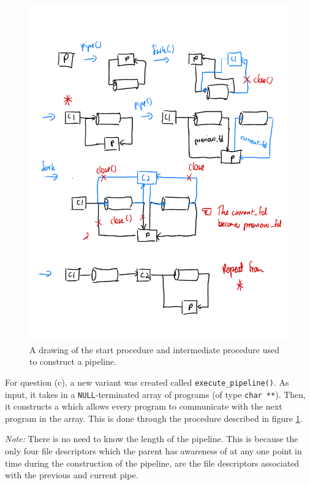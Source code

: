 \documentclass[12pt]{article}
\DeclareRobustCommand{\ul}[1]{%
	\uline{\phantom{#1}}%
	\llap{\contour{white}{#1}}%
}
\begin{document}
\begin{figure}[H]
\centering
\includegraphics{task1qc1}
\caption{A drawing of the start procedure and intermediate
procedure used to construct a pipeline.}
\label{gen_pipeline}
\end{figure}

\newpage

For question (c), a new variant was created called
\texttt{execute\_pipeline()}. As input, it takes in a
\texttt{NULL}-terminated array of programs (of type \texttt{char
**}). Then, it constructs a \ul{pipeline} which allows every
program to communicate with the next program in the array. This
is done through the procedure described in figure
\ref{gen_pipeline}.

\textit{Note:} There is no need to know the length of the
pipeline. This is because the only four file descriptors which
the parent has awareness of at any one point in time during the
construction of the pipeline, are the file descriptors 
associated with the previous and current pipe.
\end{document}
